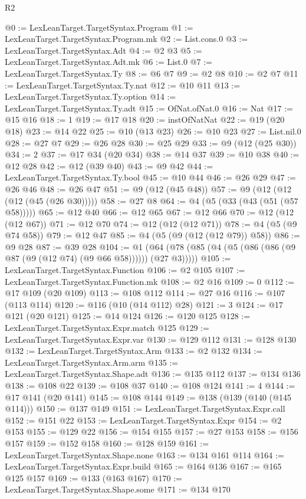 \begin{lexlean}{R2}
\begin{coremodule}
@0 := LexLeanTarget.TargetSyntax.Program
@1 := LexLeanTarget.TargetSyntax.Program.mk
@2 := List.cons.{0}
@3 := LexLeanTarget.TargetSyntax.Adt
@4 := @2 @3
@5 := LexLeanTarget.TargetSyntax.Adt.mk
@6 := List.{0}
@7 := LexLeanTarget.TargetSyntax.Ty
@8 := @6 @7
@9 := @2 @8
@10 := @2 @7
@11 := LexLeanTarget.TargetSyntax.Ty.nat
@12 := @10 @11
@13 := LexLeanTarget.TargetSyntax.Ty.option
@14 := LexLeanTarget.TargetSyntax.Ty.adt
@15 := OfNat.ofNat.{0}
@16 := Nat
@17 := @15 @16
@18 := 1
@19 := @17 @18
@20 := instOfNatNat
@22 := @19 (@20 @18)
@23 := @14 @22
@25 := @10 (@13 @23)
@26 := @10 @23
@27 := List.nil.{0}
@28 := @27 @7
@29 := @26 @28
@30 := @25 @29
@33 := @9 (@12 (@25 @30))
@34 := 2
@37 := @17 @34 (@20 @34)
@38 := @14 @37
@39 := @10 @38
@40 := @12 @28
@42 := @12 (@39 @40)
@43 := @9 @42
@44 := LexLeanTarget.TargetSyntax.Ty.bool
@45 := @10 @44
@46 := @26 @29
@47 := @26 @46
@48 := @26 @47
@51 := @9 (@12 (@45 @48))
@57 := @9 (@12 (@12 (@12 (@45 (@26 @30)))))
@58 := @27 @8
@64 := @4 (@5 (@33 (@43 (@51 (@57 @58)))))
@65 := @12 @40
@66 := @12 @65
@67 := @12 @66
@70 := @12 (@12 (@12 @67))
@71 := @12 @70
@74 := @12 (@12 (@12 @71))
@78 := @4 (@5 (@9 @74 @58))
@79 := @12 @47
@85 := @4 (@5 (@9 (@12 (@12 @79)) @58))
@86 := @9 @28
@87 := @39 @28
@104 := @1 (@64 (@78 (@85 (@4 (@5 (@86 (@86 (@9 @87 (@9 (@12 @74) (@9 @66 @58)))))) (@27 @3)))))
@105 := LexLeanTarget.TargetSyntax.Function
@106 := @2 @105
@107 := LexLeanTarget.TargetSyntax.Function.mk
@108 := @2 @16
@109 := 0
@112 := @17 @109 (@20 @109)
@113 := @108 @112
@114 := @27 @16
@116 := @107 (@113 @114)
@120 := @116 (@10 (@14 @112) @28)
@121 := 3
@124 := @17 @121 (@20 @121)
@125 := @14 @124
@126 := @120 @125
@128 := LexLeanTarget.TargetSyntax.Expr.match @125
@129 := LexLeanTarget.TargetSyntax.Expr.var
@130 := @129 @112
@131 := @128 @130
@132 := LexLeanTarget.TargetSyntax.Arm
@133 := @2 @132
@134 := LexLeanTarget.TargetSyntax.Arm.arm
@135 := LexLeanTarget.TargetSyntax.Shape.adt
@136 := @135 @112
@137 := @134 @136
@138 := @108 @22
@139 := @108 @37
@140 := @108 @124
@141 := 4
@144 := @17 @141 (@20 @141)
@145 := @108 @144
@149 := @138 (@139 (@140 (@145 @114)))
@150 := @137 @149
@151 := LexLeanTarget.TargetSyntax.Expr.call
@152 := @151 @22
@153 := LexLeanTarget.TargetSyntax.Expr
@154 := @2 @153
@155 := @129 @22
@156 := @154 @155
@157 := @27 @153
@158 := @156 @157
@159 := @152 @158
@160 := @128 @159
@161 := LexLeanTarget.TargetSyntax.Shape.none
@163 := @134 @161 @114
@164 := LexLeanTarget.TargetSyntax.Expr.build
@165 := @164 @136
@167 := @165 @125 @157
@169 := @133 (@163 @167)
@170 := LexLeanTarget.TargetSyntax.Shape.some
@171 := @134 @170

\end{coremodule}
\end{lexlean}
